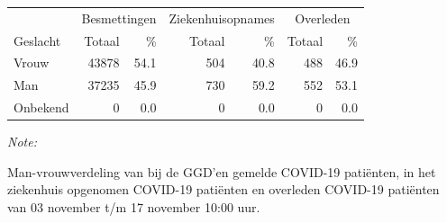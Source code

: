 \documentclass[
  english,
  man,floatsintext]{apa6}
\begin{document}
\begin{table}[H]
\centering\begingroup\fontsize{11}{13}\selectfont

\begin{threeparttable}
\begin{tabular}{lrrrrrr}
\toprule
\multicolumn{1}{c}{ } & \multicolumn{2}{c}{Besmettingen} & \multicolumn{2}{c}{Ziekenhuisopnames} & \multicolumn{2}{c}{Overleden} \\
\cmidrule(l{3pt}r{3pt}){2-3} \cmidrule(l{3pt}r{3pt}){4-5} \cmidrule(l{3pt}r{3pt}){6-7}
Geslacht & Totaal & \% & Totaal & \% & Totaal & \%\\
\midrule
Vrouw & 43878 & 54.1 & 504 & 40.8 & 488 & 46.9\\
Man & 37235 & 45.9 & 730 & 59.2 & 552 & 53.1\\
Onbekend & 0 & 0.0 & 0 & 0.0 & 0 & 0.0\\
\bottomrule
\end{tabular}
\begin{tablenotes}
\item \textit{Note: } 
\item Man-vrouwverdeling van bij de GGD’en gemelde COVID-19 patiënten, in het ziekenhuis opgenomen COVID-19 patiënten en overleden COVID-19 patiënten van 03 november t/m 17 november 10:00 uur.
\end{tablenotes}
\end{threeparttable}
\endgroup{}
\end{table}
\newpage
\end{document}
